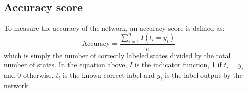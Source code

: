 \subsection{Accuracy score}
To measure the accuracy of the network, an accuracy score is defined as:
\begin{equation*}
	\text{Accuracy} = \frac{\sum_{i=1}^{n} I(t_i = y_i)}{n}
\end{equation*}
which is simply the number of correctly labeled states divided by the
total number of states. In the equation above, $I$ is the indicator function,
1 if $t_i = y_i$ and 0 otherwise. $t_i$ is the known correct label and $y_i$ is the
label output by the network.





